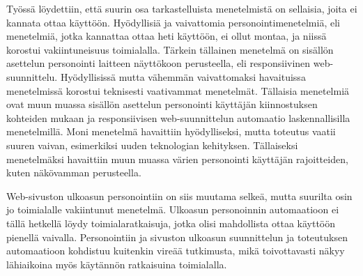 \documentclass[finnish, 12pt, a4paper, elec, utf8, a-1b]{aaltothesis}
\begin{document}
Työssä löydettiin, että suurin osa tarkastelluista menetelmistä on sellaisia,
joita ei kannata ottaa käyttöön. Hyödyllisiä ja vaivattomia
personointimenetelmiä, eli menetelmiä, jotka kannattaa ottaa heti käyttöön, ei
ollut montaa, ja niissä korostui vakiintuneisuus toimialalla. Tärkein tällainen
menetelmä on sisällön asettelun personointi laitteen näyttökoon perusteella, eli
responsiivinen web-suunnittelu. Hyödyllisissä mutta vähemmän vaivattomaksi
havaituissa menetelmissä korostui teknisesti vaativammat menetelmät. Tällaisia
menetelmiä ovat muun muassa sisällön asettelun personointi käyttäjän
kiinnostuksen kohteiden mukaan ja responsiivisen web-suunnittelun automaatio
laskennallisilla menetelmillä. Moni menetelmä havaittiin hyödylliseksi, mutta
toteutus vaatii suuren vaivan, esimerkiksi uuden teknologian kehityksen.
Tällaiseksi menetelmäksi havaittiin muun muassa värien personointi käyttäjän
rajoitteiden, kuten näkövamman perusteella.

Web-sivuston ulkoasun personointiin on siis muutama selkeä, mutta suurilta osin
jo toimialalle vakiintunut menetelmä. Ulkoasun personoinnin automaatioon ei
tällä hetkellä löydy toimialaratkaisuja, jotka olisi mahdollista ottaa käyttöön
pienellä vaivalla. Personointiin ja sivuston ulkoasun suunnittelun ja
toteutuksen automaatioon kohdistuu kuitenkin vireää tutkimusta, mikä
toivottavasti näkyy lähiaikoina myös käytännön ratkaisuina toimialalla.

\clearpage

\thesisbibliography{}
\printbibliography{}
\end{document}
